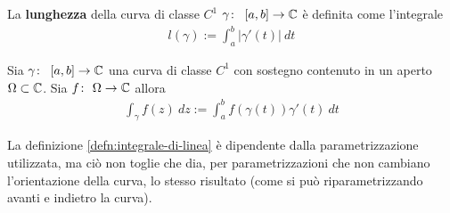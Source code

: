 \begin{definition}
	\label{defn:lunghezza-di-curva-classe-c1}
	La \textbf{lunghezza} della curva di classe $C^1$ $\gamma \colon\ \left[a,b\right] \rightarrow \mathbb{C}$ è definita come l'integrale 
	\begin{equation*}
	\begin{aligned}
		l(\gamma) := \int_{a}^{b} |\gamma'(t)|\ dt
	\end{aligned}
	\end{equation*}
\end{definition}

\begin{definition}
	\label{defn:integrale-di-linea}
	Sia $\gamma \colon\ \left[a,b\right] \rightarrow \mathbb{C}$ una curva di classe $C^1$ con sostegno contenuto in un aperto $\Omega \subset \mathbb{C}$. Sia $f \colon\ \Omega \rightarrow \mathbb{C}$ allora
	\begin{equation*}
	\begin{aligned}
		\int_\gamma f(z)\ dz := \int_{a}^b f(\gamma(t)) \gamma'(t) \ dt
	\end{aligned}
	\end{equation*}  
\end{definition}

\begin{remark}
	La definizione \ref{defn:integrale-di-linea} è dipendente dalla parametrizzazione utilizzata, ma ciò non toglie che dia, per parametrizzazioni che non cambiano l'orientazione della curva, lo stesso risultato (come si può riparametrizzando avanti e indietro la curva).
\end{remark}

